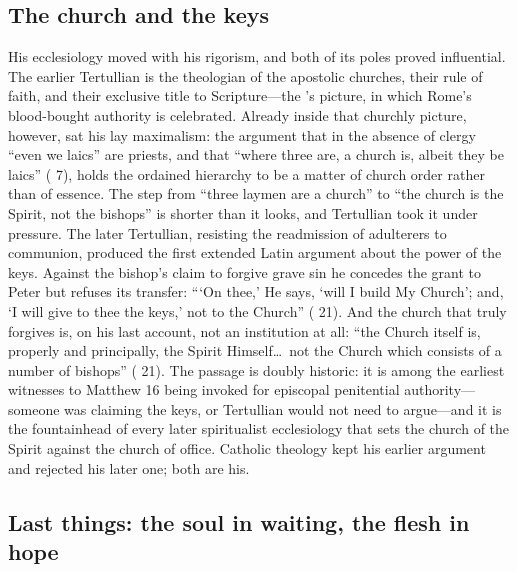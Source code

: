 \subsection{The church and the keys}

His ecclesiology moved with his rigorism, and both of its poles proved
influential. The earlier Tertullian is the theologian of the apostolic
churches, their rule of faith, and their exclusive title to Scripture---the
's picture, in which Rome's blood-bought authority is
celebrated. Already inside that churchly picture, however, sat his lay
maximalism: the argument that in the absence of clergy ``even we laics'' are
priests, and that ``where three are, a church is, albeit they be laics''
( 7), holds the ordained hierarchy to be a
matter of church order rather than of essence. The step from ``three laymen
are a church'' to ``the church is the Spirit, not the bishops'' is shorter
than it looks, and Tertullian took it under pressure. The later Tertullian, resisting the readmission of adulterers to
communion, produced the first extended Latin argument about the power of the
keys. Against the bishop's claim to forgive grave sin he concedes the grant
to Peter but refuses its transfer: ```On thee,' He says, `will I build My
Church'; and, `I will give to thee the keys,' not to the Church'' ( 21). And the church that truly forgives is, on his last account, not
an institution at all: ``the Church itself
is, properly and principally, the Spirit Himself\ldots\ not the Church which
consists of a number of bishops'' ( 21). The passage is
doubly historic: it is among the earliest witnesses to Matthew 16 being
invoked for episcopal penitential authority---someone was claiming the keys,
or Tertullian would not need to argue---and it is the fountainhead of every
later spiritualist ecclesiology that sets the church of the Spirit against
the church of office. Catholic theology kept his earlier argument and
rejected his later one; both are his.

\subsection{Last things: the soul in waiting, the flesh in hope}

